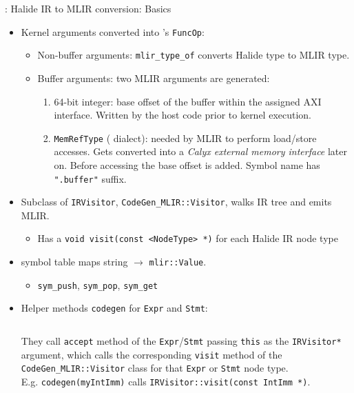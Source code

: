 \documentclass[8pt,a4paper,oneside,hidelinks,aspectratio=169,dvipsnames]{beamer}
\newcommand{\code}[1]{\texttt{\detokenize{#1}}}
\newcommand{\codecpp}[1]{\texttt{#1}}
\begin{document}
\begin{frame}{\code{CodeGen_MLIR}: Halide IR to MLIR conversion: Basics}
  \begin{itemize}
    \item Kernel arguments converted into \code{func}'s \codecpp{FuncOp}:
          \begin{itemize}
            \item Non-buffer arguments: \codecpp{mlir_type_of} converts Halide type to MLIR type.
            \item Buffer arguments: two MLIR arguments are generated:
                  \begin{enumerate}
                    \item 64-bit integer: base offset of the buffer within the assigned AXI interface. Written by the host code prior to kernel execution.
                    \item \codecpp{MemRefType} (\code{Memref} dialect): needed by MLIR to perform load/store accesses. Gets converted into a \textit{Calyx external memory interface} later on. Before accessing the base offset is added. Symbol name has \codecpp{".buffer"} suffix.
                  \end{enumerate}
          \end{itemize}
    \item Subclass of \codecpp{IRVisitor}, \codecpp{CodeGen_MLIR::Visitor}, walks IR tree and emits MLIR.
          \begin{itemize}
            \item Has a \codecpp{void visit(const <NodeType> *)} for each Halide IR node type
          \end{itemize}
    \item {} symbol table maps string $\rightarrow$ \codecpp{mlir::Value}.
          \begin{itemize}
            \item \codecpp{sym_push}, \codecpp{sym_pop}, \codecpp{sym_get}
          \end{itemize}
    \item Helper methods \codecpp{codegen} for \codecpp{Expr} and \codecpp{Stmt}:
          \begin{figure}[H]
            \centering
            \begin{minipage}{0.3\textwidth}
              \inputminted[tabsize=2,frame=single,rulecolor=gray,fontsize=\fontsize{6}{6}]{cpp}{fig/codegen_methods.cpp}
            \end{minipage}
          \end{figure}
          They call \codecpp{accept} method of the \codecpp{Expr}/\codecpp{Stmt} passing \codecpp{this} as the \codecpp{IRVisitor*} argument, which calls the corresponding \codecpp{visit} method of the \codecpp{CodeGen_MLIR::Visitor} class for that \codecpp{Expr} or \codecpp{Stmt} node type.\\
          E.g. \codecpp{codegen(myIntImm)} calls \codecpp{IRVisitor::visit(const IntImm *)}.
  \end{itemize}
\end{frame}
\end{document}
